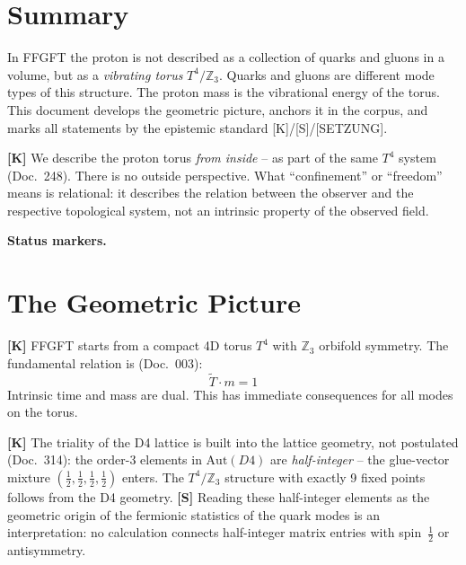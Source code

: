 
\section*{Summary}

In FFGFT the proton is not described as a collection of quarks and
gluons in a volume, but as a \emph{vibrating torus} $T^4/\mathbb{Z}_3$.
Quarks and gluons are different mode types of this structure. The proton
mass is the vibrational energy of the torus. This document develops the
geometric picture, anchors it in the corpus, and marks all statements
by the epistemic standard [K]/[S]/[SETZUNG].

\begin{tcolorbox}[colback=blue!5!white,colframe=blue!60!black,
  title=Reading note: inner perspective]
\textbf{[K]} We describe the proton torus \emph{from inside} --
as part of the same $T^4$ system (Doc.~248). There is no outside
perspective. What ``confinement'' or ``freedom'' means is relational:
it describes the relation between the observer and the respective
topological system, not an intrinsic property of the observed field.
\end{tcolorbox}

\medskip\noindent\textbf{Status markers.}


\section{The Geometric Picture}

\textbf{[K]} FFGFT starts from a compact 4D torus $T^4$ with
$\mathbb{Z}_3$ orbifold symmetry. The fundamental relation is
(Doc.~003):
\begin{equation}
  \tilde{T} \cdot m = 1
\end{equation}
Intrinsic time and mass are dual. This has immediate consequences for
all modes on the torus.

\textbf{[K]} The triality of the D4 lattice is built into the lattice
geometry, not postulated (Doc.~314): the order-3 elements in
$\text{Aut}(D4)$ are \emph{half-integer} -- the glue-vector mixture
$(\tfrac{1}{2},\tfrac{1}{2},\tfrac{1}{2},\tfrac{1}{2})$ enters. The
$T^4/\mathbb{Z}_3$ structure with exactly 9 fixed points follows from
the D4 geometry. \textbf{[S]} Reading these half-integer elements as the
geometric origin of the fermionic statistics of the quark modes is an
interpretation: no calculation connects half-integer matrix entries with
spin~$\tfrac12$ or antisymmetry.

